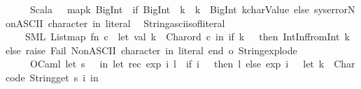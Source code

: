 \begin{isabellebody}
\ \ \ \ \ {\isacharparenleft}{\kern0pt}Scala{\isacharparenright}{\kern0pt}\ {\isachardoublequoteopen}{\isachardoublequote}{\kern0pt}{\isachardoublequote}{\kern0pt}{\isacharslash}{\kern0pt}\ {\isacharplus}{\kern0pt}{\isacharplus}{\kern0pt}{\isacharslash}{\kern0pt}\ {\isacharunderscore}{\kern0pt}{\isachardot}{\kern0pt}map{\isacharparenleft}{\kern0pt}{\isacharparenleft}{\kern0pt}k{\isacharcolon}{\kern0pt}\ BigInt{\isacharparenright}{\kern0pt}\ {\isacharequal}{\kern0pt}{\isachargreater}{\kern0pt}\ if\ {\isacharparenleft}{\kern0pt}BigInt{\isacharparenleft}{\kern0pt}{}{\isacharparenright}{\kern0pt}\ {\isacharless}{\kern0pt}{\isacharequal}{\kern0pt}\ k\ {\isacharampersand}{\kern0pt}{\isacharampersand}{\kern0pt}\ k\ {\isacharless}{\kern0pt}\ BigInt{\isacharparenleft}{\kern0pt}{}{}{}{\isacharparenright}{\kern0pt}{\isacharparenright}{\kern0pt}\ k{\isachardot}{\kern0pt}charValue\ else\ sys{\isachardot}{\kern0pt}error{\isacharparenleft}{\kern0pt}{\isachardoublequote}{\kern0pt}Non{\isacharminus}{\kern0pt}ASCII\ character\ in\ literal{\isachardoublequote}{\kern0pt}{\isacharparenright}{\kern0pt}{\isacharparenright}{\kern0pt}{\isachardoublequoteclose}\isanewline
{\isacharbar}{\kern0pt}\ \ String{\isachardot}{\kern0pt}asciis{\isacharunderscore}{\kern0pt}of{\isacharunderscore}{\kern0pt}literal\ {\isasymrightharpoonup}\isanewline
\ \ \ \ {\isacharparenleft}{\kern0pt}SML{\isacharparenright}{\kern0pt}\ {\isachardoublequoteopen}{\isacharbang}{\kern0pt}{\isacharparenleft}{\kern0pt}List{\isachardot}{\kern0pt}map\ {\isacharparenleft}{\kern0pt}fn\ c\ {\isacharequal}{\kern0pt}{\isachargreater}{\kern0pt}\ let\ val\ k\ {\isacharequal}{\kern0pt}\ Char{\isachardot}{\kern0pt}ord\ c\ in\ if\ k\ {\isacharless}{\kern0pt}\ {}{}{}\ then\ IntInf{\isachardot}{\kern0pt}fromInt\ k\ else\ raise\ Fail\ {\isachardoublequote}{\kern0pt}Non{\isacharminus}{\kern0pt}ASCII\ character\ in\ literal{\isachardoublequote}{\kern0pt}\ end{\isacharparenright}{\kern0pt}\ {\isacharslash}{\kern0pt}o\ String{\isachardot}{\kern0pt}explode{\isacharparenright}{\kern0pt}{\isachardoublequoteclose}\isanewline
\ \ \ \ \ {\isacharparenleft}{\kern0pt}OCaml{\isacharparenright}{\kern0pt}\ {\isachardoublequoteopen}{\isacharbang}{\kern0pt}{\isacharparenleft}{\kern0pt}let\ s\ {\isacharequal}{\kern0pt}\ {\isacharunderscore}{\kern0pt}\ in\ let\ rec\ exp\ i\ l\ {\isacharequal}{\kern0pt}\ if\ i\ {\isacharless}{\kern0pt}\ {}\ then\ l\ else\ exp\ {\isacharparenleft}{\kern0pt}i\ {\isacharminus}{\kern0pt}\ {}{\isacharparenright}{\kern0pt}\ {\isacharparenleft}{\kern0pt}let\ k\ {\isacharequal}{\kern0pt}\ Char{\isachardot}{\kern0pt}code\ {\isacharparenleft}{\kern0pt}String{\isachardot}{\kern0pt}get\ s\ i{\isacharparenright}{\kern0pt}\ in\isanewline

\end{isabellebody}
